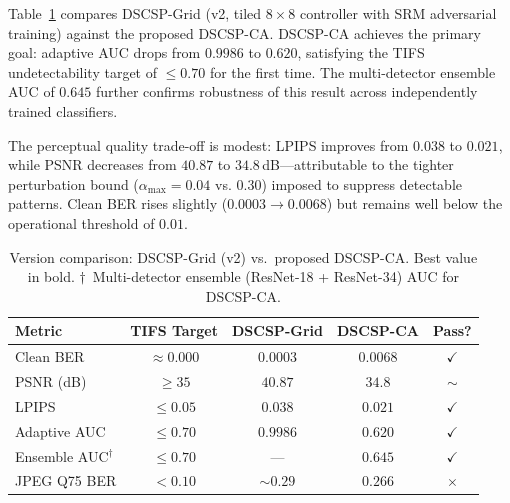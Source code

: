 \documentclass[journal]{IEEEtran}
\begin{document}
Table~\ref{tab:version_comparison} compares DSCSP-Grid (v2, tiled $8\times8$ controller with
SRM adversarial training) against the proposed DSCSP-CA.
DSCSP-CA achieves the primary goal: adaptive AUC drops from $0.9986$ to $\mathbf{0.620}$,
satisfying the TIFS undetectability target of $\leq\!0.70$ for the first time.
The multi-detector ensemble AUC of $0.645$ further confirms robustness of this result across
independently trained classifiers.

The perceptual quality trade-off is modest: LPIPS improves from $0.038$ to $0.021$, while
PSNR decreases from $40.87$ to $34.8$\,dB---attributable to the tighter perturbation bound
($\alpha_\text{max}=0.04$ vs. $0.30$) imposed to suppress detectable patterns.
Clean BER rises slightly ($0.0003\to0.0068$) but remains well below the operational threshold
of $0.01$.

\begin{table}[t]
\centering
\caption{Version comparison: DSCSP-Grid (v2) vs.\ proposed DSCSP-CA. Best value in bold.
         $\dagger$~Multi-detector ensemble (ResNet-18 + ResNet-34) AUC for DSCSP-CA.}
\label{tab:version_comparison}
\small
\begin{tabular}{@{}lcccc@{}}
\toprule
\textbf{Metric} & \textbf{TIFS Target} & \textbf{DSCSP-Grid} & \textbf{DSCSP-CA} & \textbf{Pass?} \\
\midrule
Clean BER          & $\approx 0.000$ & $0.0003$  & $\mathbf{0.0068}$  & {\color{teal!70!black}$\checkmark$} \\
PSNR (dB)          & $\geq 35$       & $40.87$   & $34.8$             & {\color{orange}$\sim$} \\
LPIPS              & $\leq 0.05$     & $0.038$   & $\mathbf{0.021}$   & {\color{teal!70!black}$\checkmark$} \\
Adaptive AUC       & $\leq 0.70$     & $0.9986$  & $\mathbf{0.620}$   & {\color{teal!70!black}$\checkmark$} \\
Ensemble AUC$^\dagger$ & $\leq 0.70$ & ---       & $0.645$            & {\color{teal!70!black}$\checkmark$} \\
JPEG Q75 BER       & $< 0.10$        & $\sim0.29$& $0.266$            & {\color{red!70!black}$\times$} \\
\bottomrule
\end{tabular}
\end{table}
\end{document}
